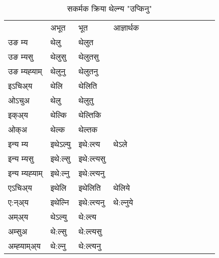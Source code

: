 \begin{table}[H]
\label{el.vt} \centering
\caption{सकर्मक क्रिया  थेल्न्य  "उप्किनु"  }
\begin{tabular}{l|l|l|l|l|l|l|l|l|l|l|l|l}  \toprule
&अभूत & भूत & आज्ञार्थक \\ 
उङ म्य &थेलु &थेलुत \\ 
उङ म्यसु &थेलुसु &थेलुतसु \\ 
उङ म्यह्‍याम् &थेलुनु &थेलुतनु \\ 
इऽचिअ्य  &थेलि &थेलिति   \\ 
ओऽचुअ &थेलु &थेलुतु   \\ 
इक्अ्य &थेल्कि &थेल्तिकि   \\ 
ओक्अ &थेल्क &थेल्तक   \\ 
इन्य म्य& इथेऽल्यु  & इथे:ल्त्य &थेऽले  \\ 
इन्य म्यसु & इथे:ल्सु  & इथे:ल्त्यसु   \\ 
इन्य म्यह्‍याम् & इथे:ल्नु  & इथे:ल्त्यनु   \\ 
एऽचिअ्य & इथेलि & इथेलिति &थेलिये    \\ 
ए:न्अ्य & इथेल्नि  & इथे:ल्त्यनु &थे:ल्नुये  \\ 
अम्अ्य & थेऽल्यु  & थे:ल्त्य  \\ 
अम्सुअ & थे:ल्सु & थे:ल्त्यसु  \\ 
अम्ह्‍याम्अ्य & थे:ल्नु  & थे:ल्त्यनु \\ 
\bottomrule
\end{tabular}
\end{table}


